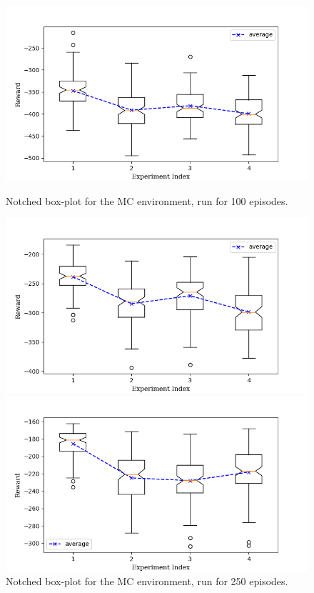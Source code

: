 \documentclass[hidelinks,journal]{IEEEtran}
\begin{document}
\begin{figure}[p]
  \centering
  \includegraphics[scale=0.45]{graph/mc1ResBox.png}
  \caption{Notched box-plot for the MC environment, run for 100 episodes.}
  \label{fig:mc1ResBox}
  \includegraphics[scale=0.45]{graph/mc2ResBox.png}
  \caption{Notched box-plot for the MC environment, run for 250 episodes.}
  \label{fig:mc2ResBox}
  \includegraphics[scale=0.45]{graph/mc3ResBox.png}

\end{figure}
\end{document}
